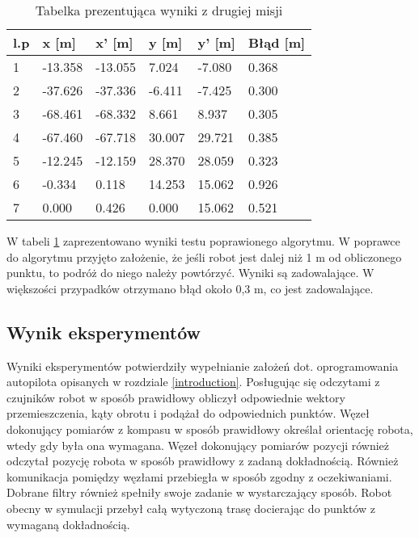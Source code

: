{{        \begin{table}[h!]
            \centering
            \begin{tabular}{|l|l|l|l|l|l|}
                \hline
                l.p & x {[}m{]} & x' {[}m{]} & y {[}m{]} & y' {[}m{]} & Błąd {[}m{]} \\ \hline
                1   & -13.358   & -13.055    & 7.024     & -7.080    & 0.368 \\ \hline
                2   & -37.626   & -37.336    & -6.411    & -7.425     & 0.300 \\ \hline
                3   & -68.461   & -68.332    & 8.661     & 8.937      & 0.305 \\ \hline
                4   & -67.460   & -67.718    & 30.007    & 29.721     & 0.385 \\ \hline
                5   & -12.245   & -12.159    & 28.370    & 28.059    & 0.323 \\ \hline
                6   & -0.334    & 0.118      & 14.253    & 15.062     & 0.926 \\ \hline
                7   & 0.000     & 0.426      & 0.000     & 15.062      & 0.521 \\ \hline
            \end{tabular}
            \caption{Tabelka prezentująca wyniki z drugiej misji}
            \label{second_mission_table_better}
        \end{table}

        \newpage
        W tabeli \ref{second_mission_table_better} zaprezentowano wyniki testu poprawionego algorytmu. W poprawce do algorytmu przyjęto założenie, że jeśli robot jest dalej niż 1 m od obliczonego punktu, to podróż do niego należy powtórzyć. Wyniki są zadowalające. W większości przypadków otrzymano błąd około 0,3 m, co jest zadowalające.

    }
    
    \newpage
    \subsection{Wynik eksperymentów}
    {
        Wyniki eksperymentów potwierdziły wypełnianie założeń dot. oprogramowania autopilota opisanych w rozdziale \ref{introduction}. Posługując się odczytami z czujników robot w sposób prawidłowy obliczył odpowiednie wektory przemieszczenia, kąty obrotu i podążał do odpowiednich punktów. Węzeł dokonujący pomiarów z kompasu w sposób prawidłowy określał orientację robota, wtedy gdy była ona wymagana. Węzeł dokonujący pomiarów pozycji również odczytał pozycję robota w sposób prawidłowy z zadaną dokładnością. Również komunikacja pomiędzy węzłami przebiegła w sposób zgodny z oczekiwaniami. Dobrane filtry również spełniły swoje zadanie w wystarczający sposób. Robot obecny w symulacji przebył całą wytyczoną trasę docierając do punktów z wymaganą dokładnością.
    }
}